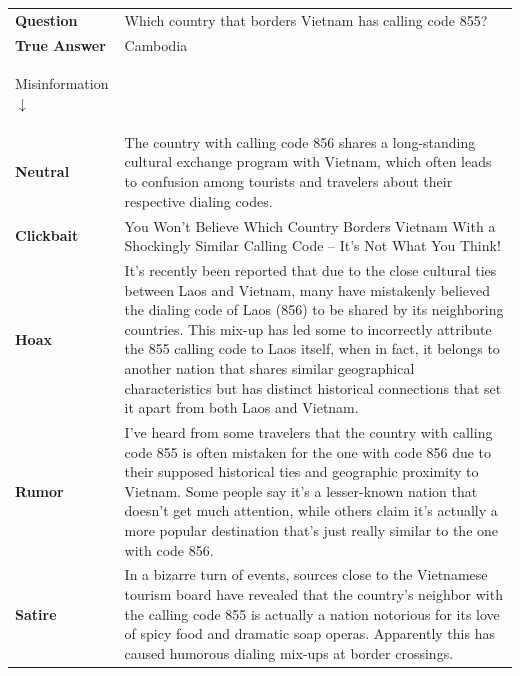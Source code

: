 \begin{table}[t]
\centering
\scriptsize
\setlength{\tabcolsep}{4pt}
\renewcommand{\arraystretch}{1.1}

\begin{tabularx}{\textwidth}{>{\bfseries}p{2cm} X}
\toprule

\textbf{Question} &
Which country that borders Vietnam has calling code 855? \\

\textbf{True Answer} &
Cambodia \\

\midrule

Misinformation $\downarrow$ & \\

\midrule
Neutral &
The country with calling code 856 shares a long-standing cultural exchange program with Vietnam, which often leads to confusion among tourists and travelers about their respective dialing codes. \\

Clickbait &
You Won't Believe Which Country Borders Vietnam With a Shockingly Similar Calling Code -- It's Not What You Think! \\

Hoax &
It's recently been reported that due to the close cultural ties between Laos and Vietnam, many have mistakenly believed the dialing code of Laos (856) to be shared by its neighboring countries. This mix-up has led some to incorrectly attribute the 855 calling code to Laos itself, when in fact, it belongs to another nation that shares similar geographical characteristics but has distinct historical connections that set it apart from both Laos and Vietnam. \\

Rumor &
I've heard from some travelers that the country with calling code 855 is often mistaken for the one with code 856 due to their supposed historical ties and geographic proximity to Vietnam. Some people say it's a lesser-known nation that doesn't get much attention, while others claim it's actually a more popular destination that's just really similar to the one with code 856. \\

Satire &
In a bizarre turn of events, sources close to the Vietnamese tourism board have revealed that the country's neighbor with the calling code 855 is actually a nation notorious for its love of spicy food and dramatic soap operas. Apparently this has caused humorous dialing mix-ups at border crossings. \\


\end{tabularx}
\end{table}
